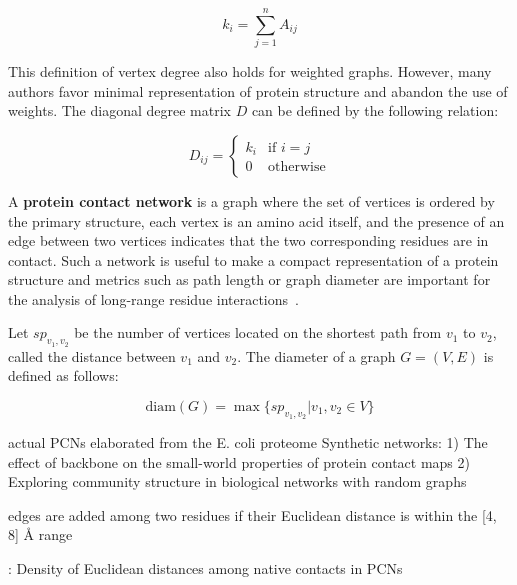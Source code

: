         \begin{equation}
            k_i = \sum\limits_{j=1}^{n} A_{ij}
        \end{equation}

        This definition of vertex degree also holds for weighted graphs. However, many authors favor minimal representation of protein structure
        and abandon the use of weights. The diagonal degree matrix $D$ can be defined by the following relation:

        \begin{equation}
            D_{ij} =
                \begin{cases}
                    k_i & \text{if } i = j \\
                    0 & \text{otherwise}
                \end{cases}
        \end{equation}

        A \textbf{protein contact network} is a graph where the set of vertices is ordered by the primary structure, each vertex is an amino acid itself,
        and the presence of an edge between two vertices indicates that the two corresponding residues are in contact. Such a network is useful to make a compact
        representation of a protein structure and metrics such as path length or graph diameter are important for the analysis of long-range residue
        interactions~\cite{doi:10.1021/cr3002356}.

        Let $sp_{v_1,v_2}$ be the number of vertices located on the shortest path from $v_1$ to $v_2$, called the distance between $v_1$ and $v_2$.
        The diameter of a graph $G = (V, E)$ is defined as follows:

        \begin{equation}
            \text{diam}(G) = \max \{ sp_{v_1, v_2} | v_1, v_2 \in V \}
        \end{equation}


        \cite{doi:10.1080/07391102.2015.1077736}  %
        actual PCNs elaborated from the E. coli proteome  %
        Synthetic networks:  %
        1) The effect of backbone on the small-world properties of protein contact maps
        2) Exploring community structure in biological networks with random graphs

        edges are added among two residues if their Euclidean distance is within the [4, 8] \AA{} range  %

        : Density of Euclidean distances among native contacts in PCNs

